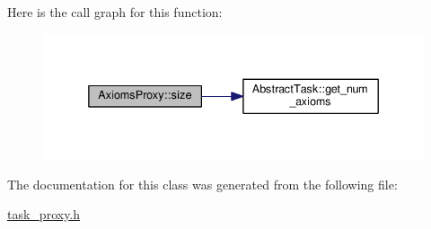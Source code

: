 Here is the call graph for this function\-:
\nopagebreak
\begin{figure}[H]
\begin{center}
\leavevmode
\includegraphics[width=336pt]{classAxiomsProxy_aea7209589c94878185298ddf3a328720_cgraph}
\end{center}
\end{figure}




The documentation for this class was generated from the following file\-:\begin{DoxyCompactItemize}
\item 
\hyperlink{task__proxy_8h}{task\-\_\-proxy.\-h}\end{DoxyCompactItemize}
